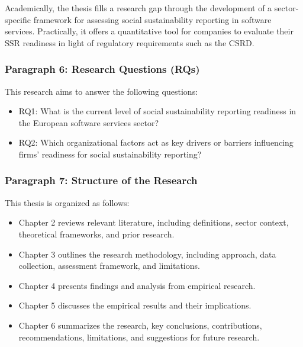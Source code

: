 Academically, the thesis fills a research gap through the 
development of a sector-specific framework for assessing social sustainability
reporting in software services. Practically, it offers a quantitative tool 
for companies to evaluate their SSR readiness in light of regulatory 
requirements such as the CSRD.

\subsubsection{Paragraph 6: Research Questions (RQs)}
This research aims to answer the following questions:
\begin{itemize}
    \item RQ1: What is the current level of social sustainability reporting readiness 
    in the European software services sector?
    \item RQ2: Which organizational factors act as key drivers or barriers 
    influencing firms' readiness for social sustainability reporting?
\end{itemize}

\subsubsection{Paragraph 7: Structure of the Research}
This thesis is organized as follows:
\begin{itemize}
    \item Chapter 2 reviews relevant literature, including definitions, 
    sector context, theoretical frameworks, and prior research.
    \item Chapter 3 outlines the research methodology, including approach, 
    data collection, assessment framework, and limitations.
    \item Chapter 4 presents findings and analysis from empirical research.
    \item Chapter 5 discusses the empirical results and their implications.
    \item Chapter 6 summarizes the research, key conclusions, contributions, 
    recommendations, limitations, and suggestions for future research.
\end{itemize}